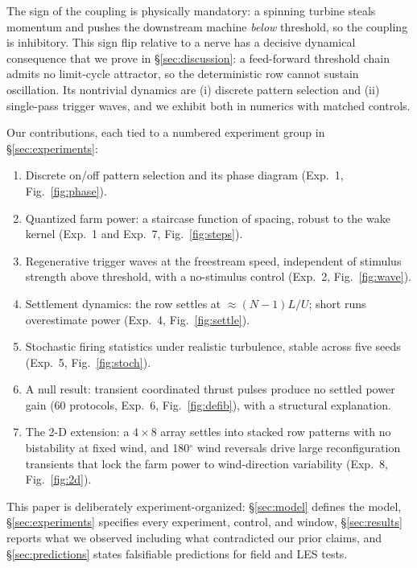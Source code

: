 \documentclass[11pt]{article}
\begin{document}
The sign of the coupling is physically mandatory: a spinning turbine steals momentum and
pushes the downstream machine \emph{below} threshold, so the coupling is inhibitory. This
sign flip relative to a nerve has a decisive dynamical consequence that we prove in
\S\ref{sec:discussion}: a feed-forward threshold chain admits no limit-cycle attractor, so
the deterministic row cannot sustain oscillation. Its nontrivial dynamics are (i) discrete
pattern selection and (ii) single-pass trigger waves, and we exhibit both in numerics with
matched controls.

Our contributions, each tied to a numbered experiment group in \S\ref{sec:experiments}:

\begin{enumerate}
\item Discrete on/off pattern selection and its phase diagram (Exp.~1, Fig.~\ref{fig:phase}).
\item Quantized farm power: a staircase function of spacing, robust to the wake kernel
(Exp.~1 and Exp.~7, Fig.~\ref{fig:steps}).
\item Regenerative trigger waves at the freestream speed, independent of stimulus strength
above threshold, with a no-stimulus control (Exp.~2, Fig.~\ref{fig:wave}).
\item Settlement dynamics: the row settles at $\approx (N-1)L/U$; short runs overestimate
power (Exp.~4, Fig.~\ref{fig:settle}).
\item Stochastic firing statistics under realistic turbulence, stable across five seeds
(Exp.~5, Fig.~\ref{fig:stoch}).
\item A null result: transient coordinated thrust pulses produce no settled power gain
(60 protocols, Exp.~6, Fig.~\ref{fig:defib}), with a structural explanation.
\item The 2-D extension: a $4\times 8$ array settles into stacked row patterns with no
bistability at fixed wind, and 180$^\circ$ wind reversals drive large reconfiguration
transients that lock the farm power to wind-direction variability (Exp.~8, Fig.~\ref{fig:2d}).
\end{enumerate}

This paper is deliberately experiment-organized: \S\ref{sec:model} defines the model,
\S\ref{sec:experiments} specifies every experiment, control, and window, \S\ref{sec:results}
reports what we observed including what contradicted our prior claims, and
\S\ref{sec:predictions} states falsifiable predictions for field and LES tests.
\end{document}
